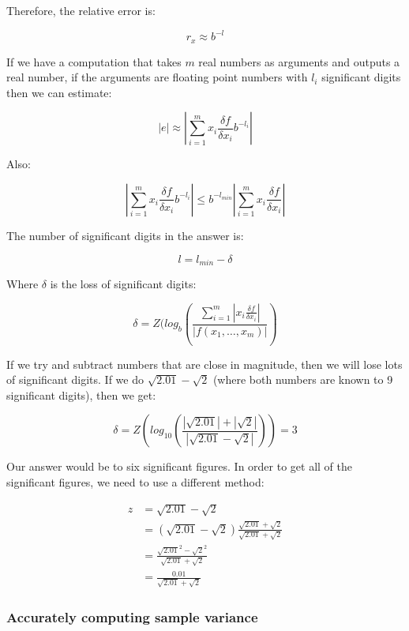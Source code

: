 Therefore, the relative error is:

\[
  r_x \approx b^{-l}
\]

If we have a computation that takes $m$ real numbers as arguments and outputs a
real number, if the arguments are floating point numbers with $l_i$ significant
digits then we can estimate:

\[
  |e| \approx |\sum^m_{i=1} x_i\frac{\delta f}{\delta x_i}b^{-l_i}|
\]

Also:

\[
  |\sum^m_{i=1} x_i\frac{\delta f}{\delta x_i}b^{-l_i}|
    \leq b^{-l_{min}}|\sum^m_{i=1} x_i\frac{\delta f}{\delta x_i}|
\]

The number of significant digits in the answer is:

\[
  l = l_{min} - \delta
\]

Where $\delta$ is the loss of significant digits:

\[
  \delta = Z(log_b(
    \frac{
      \sum^m_{i=1}|x_i\frac{\delta f}{\delta x_i}|
    }{
      |f(x_1, \dots, x_m)|
    }
  )
\]

If we try and subtract numbers that are close in magnitude, then we will lose
lots of significant digits. If we do $\sqrt{2.01} - \sqrt{2}$ (where both
numbers are known to 9 significant digits), then we get:

\[
  \delta = Z(log_10(
    \frac{
      |\sqrt{2.01}| + |\sqrt{2}|
    }{
      |\sqrt{2.01} - \sqrt{2}|
    })) = 3
\]

Our answer would be to six significant figures. In order to get all of the
significant figures, we need to use a different method:

\[
  \begin{split}
    z &= \sqrt{2.01} - \sqrt{2}\\
      &= (\sqrt{2.01} - \sqrt{2})\frac{\sqrt{2.01}
         + \sqrt{2}}{\sqrt{2.01} + \sqrt{2}}\\
      &= \frac{\sqrt{2.01}^2 - \sqrt{2}^2}{\sqrt{2.01} + \sqrt{2}}\\
      &= \frac{0.01}{\sqrt{2.01} + \sqrt{2}}
  \end{split}
\]


\subsubsection{Accurately computing sample variance}

